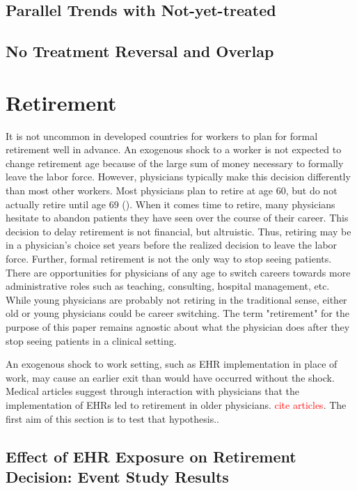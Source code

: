 \documentclass[11pt]{article}
\begin{document}
\subsection{Parallel Trends with Not-yet-treated}

\subsection{No Treatment Reversal and Overlap}




\section{Retirement}

It is not uncommon in developed countries for workers to plan for formal retirement well in advance. An exogenous shock to a worker is not expected to change retirement age because of the large sum of money necessary to formally leave the labor force. However, physicians typically make this decision differently than most other workers. Most physicians plan to retire at age 60, but do not actually retire until age 69 (\cite{collier2017challenges}). When it comes time to retire, many physicians hesitate to abandon patients they have seen over the course of their career. This decision to delay retirement is not financial, but altruistic. Thus, retiring may be in a physician's choice set years before the realized decision to leave the labor force. Further, formal retirement is not the only way to stop seeing patients. There are opportunities for physicians of any age to switch careers towards more administrative roles such as teaching, consulting, hospital management, etc. While young physicians are probably not retiring in the traditional sense, either old or young physicians could be career switching. The term "retirement" for the purpose of this paper remains agnostic about what the physician does after they stop seeing patients in a clinical setting. 

An exogenous shock to work setting, such as EHR implementation in place of work, may cause an earlier exit than would have occurred without the shock. Medical articles suggest through interaction with physicians that the implementation of EHRs led to retirement in older physicians. \textcolor{red}{cite articles}. The first aim of this section is to test that hypothesis.. 

\subsection{Effect of EHR Exposure on Retirement Decision: Event Study Results}
\end{document}
